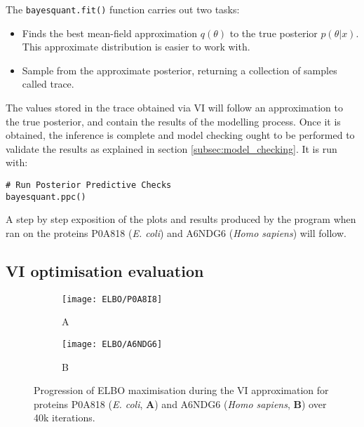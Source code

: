 The \texttt{bayesquant.fit()} function carries out two tasks:

\begin{itemize}
\item Finds the best mean-field approximation $q(\theta)$ to the true posterior $p(\theta|x)$. This approximate distribution is easier to work with.
\item Sample from the approximate posterior, returning a collection of samples called trace.
\end{itemize}

The values stored in the trace obtained via VI will follow an approximation to the true posterior, and contain the results of the modelling process. Once it is obtained, the inference is complete and model checking ought to be performed to validate the results as explained in section \ref{subsec:model_checking}. It is run with:

\begin{verbatim}
# Run Posterior Predictive Checks
bayesquant.ppc()
\end{verbatim}

A step by step exposition of the plots and results produced by the program when ran on the proteins  P0A818 (\textit{E. coli}) and A6NDG6 (\textit{Homo sapiens}) will follow.

\subsection{VI optimisation evaluation}


\begin{figure}[H]
\begin{subfigure}{.45\textwidth}
\centering
\caption*{A}
\texttt{[image: ELBO/P0A8I8]}
\end{subfigure}
\begin{subfigure}{.45\textwidth}
\centering
\caption*{B}
\texttt{[image: ELBO/A6NDG6]}
\end{subfigure}
\caption[ELBO progression]{Progression of \ac{ELBO} maximisation during the \ac{VI} approximation for proteins P0A818 (\textit{E. coli}, \textbf{A}) and A6NDG6 (\textit{Homo sapiens}, \textbf{B}) over 40k iterations.}
\label{fig:ELBO}
\end{figure}

